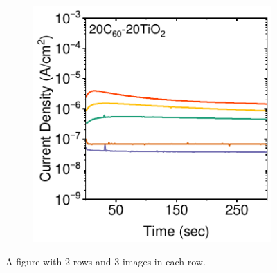 \begin{figure}[!ht]
\begin{subfigure}[b]{0.32\textwidth}
        \caption{}
    \end{subfigure}
    \hfill
    \begin{subfigure}[b]{0.32\textwidth}
        \centering
        \includegraphics[width=\textwidth]{chapters/transport_layers/images/StaticJV_20_20.pdf}
        \caption{}
    \end{subfigure}

    \caption{A figure with 2 rows and 3 images in each row.}
    \label{fig:etl_opt:dynamicjv_eqe_staticjv}
\end{figure}

